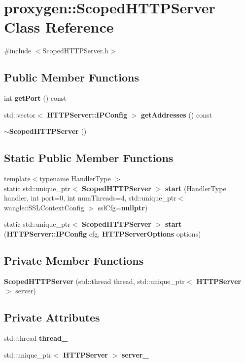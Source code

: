\section{proxygen\+:\+:Scoped\+H\+T\+T\+P\+Server Class Reference}
\label{classproxygen_1_1ScopedHTTPServer}


{\ttfamily \#include $<$Scoped\+H\+T\+T\+P\+Server.\+h$>$}

\subsection*{Public Member Functions}
\begin{DoxyCompactItemize}
\item 
int {\bf get\+Port} () const 
\item 
std\+::vector$<$ {\bf H\+T\+T\+P\+Server\+::\+I\+P\+Config} $>$ {\bf get\+Addresses} () const 
\item 
{\bf $\sim$\+Scoped\+H\+T\+T\+P\+Server} ()
\end{DoxyCompactItemize}
\subsection*{Static Public Member Functions}
\begin{DoxyCompactItemize}
\item 
{\footnotesize template$<$typename Handler\+Type $>$ }\\static std\+::unique\+\_\+ptr$<$ {\bf Scoped\+H\+T\+T\+P\+Server} $>$ {\bf start} (Handler\+Type handler, int port=0, int num\+Threads=4, std\+::unique\+\_\+ptr$<$ wangle\+::\+S\+S\+L\+Context\+Config $>$ ssl\+Cfg={\bf nullptr})
\item 
static std\+::unique\+\_\+ptr$<$ {\bf Scoped\+H\+T\+T\+P\+Server} $>$ {\bf start} ({\bf H\+T\+T\+P\+Server\+::\+I\+P\+Config} cfg, {\bf H\+T\+T\+P\+Server\+Options} options)
\end{DoxyCompactItemize}
\subsection*{Private Member Functions}
\begin{DoxyCompactItemize}
\item 
{\bf Scoped\+H\+T\+T\+P\+Server} (std\+::thread thread, std\+::unique\+\_\+ptr$<$ {\bf H\+T\+T\+P\+Server} $>$ server)
\end{DoxyCompactItemize}
\subsection*{Private Attributes}
\begin{DoxyCompactItemize}
\item 
std\+::thread {\bf thread\+\_\+}
\item 
std\+::unique\+\_\+ptr$<$ {\bf H\+T\+T\+P\+Server} $>$ {\bf server\+\_\+}
\end{DoxyCompactItemize}



